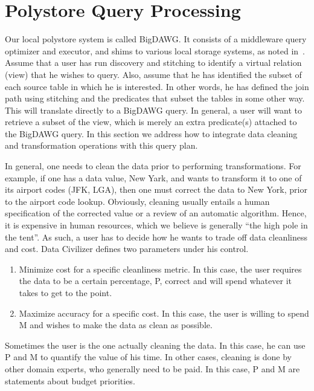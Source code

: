 \section{Polystore Query Processing}
\label{sec:curating}

Our local polystore system is called BigDAWG.  It consists of a middleware query
optimizer and executor, and shims to various local storage systems, as noted
in~\cite{DBLP:journals/sigmod/DugganESBHKMMMZ15,
DBLP:journals/pvldb/ElmoreDSBCGHHKK15}.  Assume that a user has run discovery
and stitching to identify a virtual relation (view) that he wishes to query.
Also, assume that he has identified the subset of each source table in which he
is interested.  In other words, he has defined the join path using stitching and
the predicates that subset the tables in some other way.  This will translate
directly to a BigDAWG query.  In general, a user will want to retrieve a subset
of the view, which is merely an extra predicate(s) attached to the BigDAWG
query.   In this section we address how to integrate data cleaning and
transformation operations with this query plan.

In general, one needs to clean the data prior to performing transformations.
For example, if one has a data value, New Yark, and wants to transform it to one
of its airport codes (JFK, LGA), then one must correct the data to New York,
prior to the airport code lookup.  Obviously, cleaning usually entails a human
specification of the corrected value or a review of an automatic algorithm.
Hence, it is expensive in human resources, which we believe is generally ``the
high pole in the tent''.  As such, a user has to decide how he wants to trade off
data cleanliness and cost.  Data Civilizer defines two parameters under his
control.

\begin{enumerate}
\item Minimize cost for a specific cleanliness metric.  In this case, the
user requires the data to be a certain percentage, P, correct and will spend
whatever it takes to get to the point.
\item Maximize accuracy for a specific cost.  In this case, the user is
willing to spend M and wishes to make the data as clean as possible.
\end{enumerate}

Sometimes the user is the one actually cleaning the data.  In this case, he can
use P and M to quantify the value of his time.  In other cases, cleaning is done
by other domain experts, who generally need to be paid.  In this case, P and M
are statements about budget priorities.

